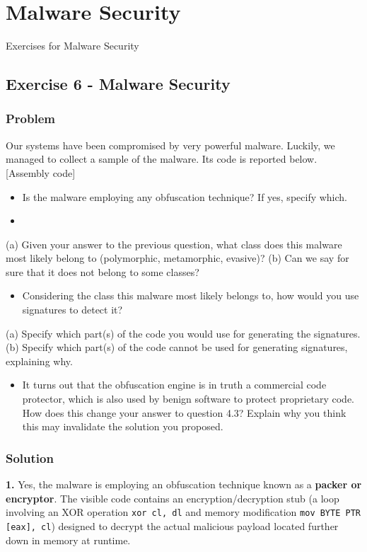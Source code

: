 \documentclass{article}
\begin{document}
\section{Malware Security}
Exercises for Malware Security

\subsection{Exercise 6 - Malware Security}
\subsubsection*{Problem}
Our systems have been compromised by very powerful malware. Luckily, we managed to collect a sample of the malware. Its code is reported below.
[Assembly code]
\begin{itemize}
    \item[\textbf{1.}] [1 point] Is the malware employing any obfuscation technique? If yes, specify which.
    \item[\textbf{2.}] [2 points]
\end{itemize}
(a) Given your answer to the previous question, what class does this malware most likely belong to (polymorphic, metamorphic, evasive)?
(b) Can we say for sure that it does not belong to some classes?
\begin{itemize}
    \item[\textbf{3.}] [2 points] Considering the class this malware most likely belongs to, how would you use signatures to detect it?
\end{itemize}
(a) Specify which part(s) of the code you would use for generating the signatures.
(b) Specify which part(s) of the code cannot be used for generating signatures, explaining why.
\begin{itemize}
    \item[\textbf{4.}] [1 point] It turns out that the obfuscation engine is in truth a commercial code protector, which is also used by benign software to protect proprietary code. How does this change your answer to question 4.3? Explain why you think this may invalidate the solution you proposed.
\end{itemize}

\subsubsection*{Solution}
\textbf{1.} Yes, the malware is employing an obfuscation technique known as a \textbf{packer or encryptor}. The visible code contains an encryption/decryption stub (a loop involving an XOR operation \texttt{xor cl, dl} and memory modification \texttt{mov BYTE PTR [eax], cl}) designed to decrypt the actual malicious payload located further down in memory at runtime.
\end{document}
